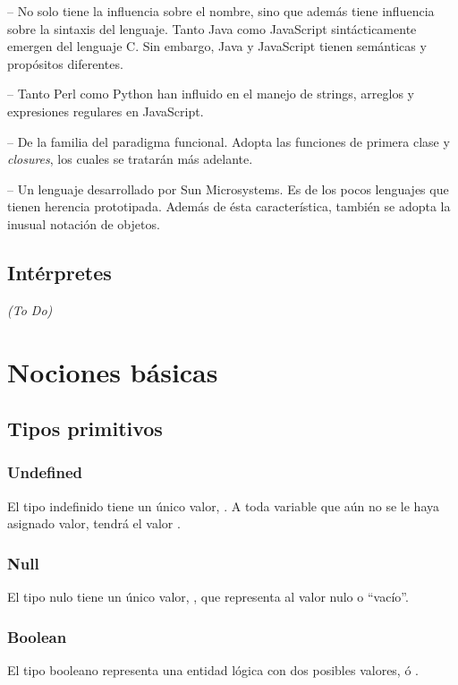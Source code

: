  -- No solo tiene la influencia sobre el nombre, sino que además tiene influencia sobre la sintaxis del lenguaje. Tanto Java como JavaScript sintácticamente emergen del lenguaje C. Sin embargo, Java y JavaScript tienen semánticas y propósitos diferentes.

 -- Tanto Perl como Python han influido en el manejo de strings, arreglos y expresiones regulares en JavaScript.

 -- De la familia del paradigma funcional. Adopta las funciones de primera clase y \textit{closures}, los cuales se tratarán más adelante.

 -- Un lenguaje desarrollado por Sun Microsystems. Es de los pocos lenguajes que tienen herencia prototipada. Además de ésta característica, también se adopta la inusual notación de objetos.

\subsection{Intérpretes}

\textit{(To Do)}



\section{Nociones básicas}

\subsection{Tipos primitivos}

\subsubsection{Undefined} 
El tipo indefinido tiene un único valor, . A toda variable que aún no se le haya asignado valor, tendrá el valor .

\subsubsection{Null} 
El tipo nulo tiene un único valor, , que representa al valor nulo o "`vacío"'.

\subsubsection{Boolean} 
El tipo booleano representa una entidad lógica con dos posibles valores,  ó .


